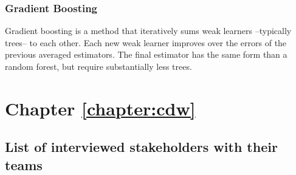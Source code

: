 \documentclass[french,12pt,twoside,a4paper]{book}
\let\fontnumber\relax
\renewcommand{\thesection}{\fontnumber{\color{chaptercolor}\arabic{chapter}.}\arabic{section}}
\renewcommand{\thesubsection}{\fontnumber{\color{chaptercolor}\arabic{chapter}.}\arabic{section}.\arabic{subsection}}
\begin{document}
\begin{appendices}
  \subsection{Gradient Boosting}\label{apd:intro:boosting}

  Gradient boosting \citep{friedman2001greedy} is a method that iteratively sums
  weak learners --typically trees-- to each other. Each new weak learner
  improves over the errors of the previous averaged estimators. The final
  estimator has the same form than a random forest, but require substantially
  less trees.


  \chapter{Chapter \ref{chapter:cdw}}\label{apd:cdw}

  \section{List of interviewed stakeholders with their
    teams}\label{apd:cdw:table:expert_teams}


\end{appendices}
\end{document}
